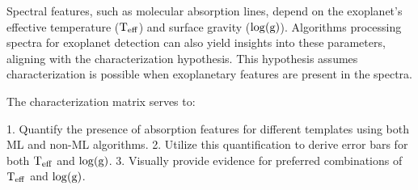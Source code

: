 Spectral features, such as molecular absorption lines, depend on the exoplanet's effective temperature ($\rm{T_{eff}}$) and surface gravity ($\rm{\log(g)}$). Algorithms processing spectra for exoplanet detection can also yield insights into these parameters, aligning with the characterization hypothesis. This hypothesis assumes characterization is possible when exoplanetary features are present in the spectra.

The characterization matrix serves to:

1. Quantify the presence of absorption features for different templates using both ML and non-ML algorithms.
2. Utilize this quantification to derive error bars for both $\rm{T_{eff}}$ and $\rm{\log(g)}$.
3. Visually provide evidence for preferred combinations of $\rm{T_{eff}}$ and $\rm{\log(g)}$.

